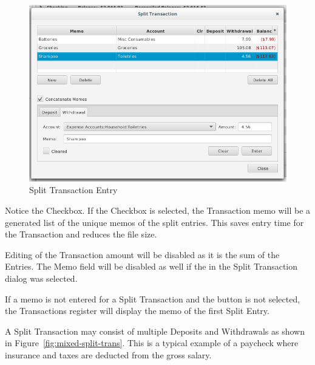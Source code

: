 \documentclass[letterpaper,12pt]{book}
\begin{document}
    \begin{figure}[H]
        \caption{Split Transaction Entry}
        \includegraphics[width=1.0\linewidth]{images/splitTransactionEntry}
    \end{figure}

    Notice the  Checkbox. If the Checkbox is selected, the Transaction memo will be a generated list
    of the unique memos of the split entries. This saves entry time for the Transaction and reduces the file size.

    Editing of the Transaction amount will be disabled as it is the sum of the Entries. The Memo field will be disabled
    as well if the  in the Split Transaction dialog was selected.

    If a memo is not entered for a Split Transaction and the  button is not selected, the
    Transactions register will display the memo of the first Split Entry.

    A Split Transaction may consist of multiple Deposits and Withdrawals as shown in Figure~\ref{fig:mixed-split-trans}. 
    This is a typical example of a paycheck where insurance and taxes are deducted from the gross salary.

\end{document}
